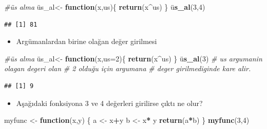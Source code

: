 \documentclass[
  oneside]{book}
\newenvironment{Shaded}{\begin{snugshade}}{\end{snugshade}}
\newcommand{\AttributeTok}[1]{\textcolor[rgb]{0.13,0.29,0.53}{#1}}
\newcommand{\CommentTok}[1]{\textcolor[rgb]{0.56,0.35,0.01}{\textit{#1}}}
\newcommand{\ControlFlowTok}[1]{\textcolor[rgb]{0.13,0.29,0.53}{\textbf{#1}}}
\newcommand{\DecValTok}[1]{\textcolor[rgb]{0.00,0.00,0.81}{#1}}
\newcommand{\FunctionTok}[1]{\textcolor[rgb]{0.13,0.29,0.53}{\textbf{#1}}}
\newcommand{\NormalTok}[1]{#1}
\newcommand{\OtherTok}[1]{\textcolor[rgb]{0.56,0.35,0.01}{#1}}
\newcommand{\SpecialCharTok}[1]{\textcolor[rgb]{0.81,0.36,0.00}{\textbf{#1}}}
\providecommand{\tightlist}{%
  \setlength{\itemsep}{0pt}\setlength{\parskip}{0pt}}
\begin{document}
\begin{Shaded}
\begin{Highlighting}[]
\CommentTok{\#üs alma}
\NormalTok{üs\_al}\OtherTok{\textless{}{-}}  \ControlFlowTok{function}\NormalTok{(x,us)\{}
  \FunctionTok{return}\NormalTok{(x}\SpecialCharTok{\^{}}\NormalTok{us)}
\NormalTok{  \}}
\NormalTok{ü}\FunctionTok{s\_al}\NormalTok{(}\DecValTok{3}\NormalTok{,}\DecValTok{4}\NormalTok{)}
\end{Highlighting}
\end{Shaded}

\begin{verbatim}
## [1] 81
\end{verbatim}

\begin{itemize}
\tightlist
\item
  Argümanlardan birine olağan değer girilmesi
\end{itemize}

\begin{Shaded}
\begin{Highlighting}[]
\CommentTok{\#üs alma}
\NormalTok{üs\_al}\OtherTok{\textless{}{-}}  \ControlFlowTok{function}\NormalTok{(x,}\AttributeTok{us=}\DecValTok{2}\NormalTok{)\{}
  \FunctionTok{return}\NormalTok{(x}\SpecialCharTok{\^{}}\NormalTok{us)}
\NormalTok{  \}}
\NormalTok{ü}\FunctionTok{s\_al}\NormalTok{(}\DecValTok{3}\NormalTok{) }\CommentTok{\# us argumanin olagan degeri olan}
\CommentTok{\# 2 olduğu için argumana }
\CommentTok{\# deger girilmediginde kare alir.}
\end{Highlighting}
\end{Shaded}

\begin{verbatim}
## [1] 9
\end{verbatim}

\begin{itemize}
\tightlist
\item
  Aşağıdaki fonksiyona 3 ve 4 değerleri girilirse çıktı ne olur?
\end{itemize}

\begin{Shaded}
\begin{Highlighting}[]
\NormalTok{myfunc }\OtherTok{\textless{}{-}}  \ControlFlowTok{function}\NormalTok{(x,y)}
\NormalTok{\{}
\NormalTok{a }\OtherTok{\textless{}{-}}\NormalTok{  x}\SpecialCharTok{+}\NormalTok{y}
\NormalTok{b }\OtherTok{\textless{}{-}}\NormalTok{  x}\SpecialCharTok{*}\NormalTok{ y}
\FunctionTok{return}\NormalTok{(a}\SpecialCharTok{*}\NormalTok{b)}
\NormalTok{\}}
\FunctionTok{myfunc}\NormalTok{(}\DecValTok{3}\NormalTok{,}\DecValTok{4}\NormalTok{)}
\end{Highlighting}
\end{Shaded}
\end{document}
